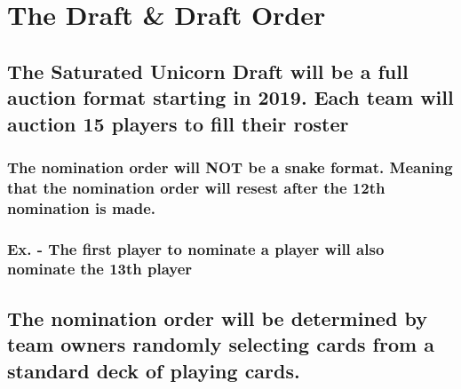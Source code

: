 \documentclass[
]{book}
\begin{document}
\hypertarget{the-draft-draft-order}{%
\section{The Draft \& Draft Order}\label{the-draft-draft-order}}

\hypertarget{the-saturated-unicorn-draft-will-be-a-full-auction-format-starting-in-2019.-each-team-will-auction-15-players-to-fill-their-roster}{%
\subsection{The Saturated Unicorn Draft will be a full auction format starting in 2019. Each team will auction 15 players to fill their roster}\label{the-saturated-unicorn-draft-will-be-a-full-auction-format-starting-in-2019.-each-team-will-auction-15-players-to-fill-their-roster}}

\hypertarget{the-nomination-order-will-not-be-a-snake-format.-meaning-that-the-nomination-order-will-resest-after-the-12th-nomination-is-made.}{%
\subsubsection{The nomination order will NOT be a snake format. Meaning that the nomination order will resest after the 12th nomination is made.}\label{the-nomination-order-will-not-be-a-snake-format.-meaning-that-the-nomination-order-will-resest-after-the-12th-nomination-is-made.}}

\hypertarget{ex.---the-first-player-to-nominate-a-player-will-also-nominate-the-13th-player}{%
\subsubsection{Ex. - The first player to nominate a player will also nominate the 13th player}\label{ex.---the-first-player-to-nominate-a-player-will-also-nominate-the-13th-player}}

\hypertarget{the-nomination-order-will-be-determined-by-team-owners-randomly-selecting-cards-from-a-standard-deck-of-playing-cards.}{%
\subsection{The nomination order will be determined by team owners randomly selecting cards from a standard deck of playing cards.}\label{the-nomination-order-will-be-determined-by-team-owners-randomly-selecting-cards-from-a-standard-deck-of-playing-cards.}}
\end{document}
